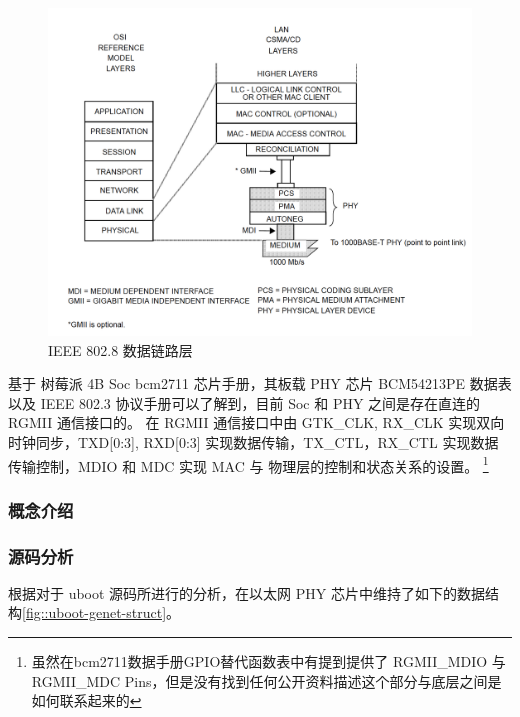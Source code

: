     \begin{figure}[ht]
        \centering
        \includegraphics[scale=0.4]{imgs/data_link_layers.jpg}
        \caption{IEEE 802.8 数据链路层}    \label{fig::dataLink}
    \end{figure}

    基于 树莓派 4B Soc bcm2711 芯片手册，其板载 PHY 芯片 BCM54213PE 数据表以及 IEEE 802.3 协议手册可以了解到，目前 Soc 和 PHY 之间是存在直连的 RGMII 通信接口的。
    在 RGMII 通信接口中由 GTK\_CLK, RX\_CLK 实现双向时钟同步，TXD[0:3], RXD[0:3] 实现数据传输，TX\_CTL，RX\_CTL 实现数据传输控制，MDIO 和 MDC 实现 MAC 与 物理层的控制和状态关系的设置。
    \footnote{虽然在bcm2711数据手册GPIO替代函数表中有提到提供了 RGMII\_MDIO 与 RGMII\_MDC Pins，但是没有找到任何公开资料描述这个部分与底层之间是如何联系起来的}


    \subsubsection{概念介绍}

    \subsubsection{源码分析}

    根据对于 uboot 源码所进行的分析，在以太网 PHY 芯片中维持了如下的数据结构\ref{fig::uboot-genet-struct}。

